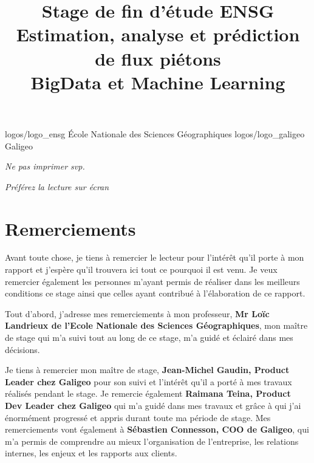 \documentclass{themeensg}
\title{Stage de fin d'étude ENSG \\ Estimation, analyse et prédiction de flux piétons \\ BigData et Machine Learning}
\renewcommand{\author}{Jules Pierrat}
\begin{document}
\begin{titlepage}
\enterprise 
{logos/logo_ensg}
{\'Ecole Nationale des Sciences Géographiques}
{logos/logo_galigeo}
{Galigeo}





\infos{\author}{Septembre 2022}

\begin{center}
  \textit{Ne pas imprimer svp.}
  
  \textit{Préférez la lecture sur écran}
\end{center}

\end{titlepage}



\newevenpage
\chapter*{Remerciements}

Avant toute chose, je tiens à remercier le lecteur pour l’intérêt qu’il porte à mon rapport et j’espère qu’il trouvera ici tout ce pourquoi il est venu. Je veux remercier également les personnes m’ayant permis de réaliser dans les meilleurs conditions ce stage ainsi que celles ayant contribué à l’élaboration de ce rapport.

Tout d'abord, j'adresse mes remerciements à mon professeur, \textbf{Mr Loïc Landrieux de l’Ecole Nationale des Sciences Géographiques}, mon maître de stage qui m’a suivi tout au long de ce stage, m’a guidé et éclairé dans mes décisions.

Je tiens à remercier mon maître de stage, \textbf{Jean-Michel Gaudin, Product Leader chez Galigeo} pour son suivi et l’intérêt qu’il a porté à mes travaux réalisés pendant le stage. Je remercie également \textbf{Raimana Teina, Product Dev Leader chez Galigeo} qui m’a guidé dans mes travaux et grâce à qui j’ai énormément progressé et appris durant toute ma période de stage. Mes remerciements vont également à \textbf{Sébastien Connesson, COO de Galigeo}, qui m’a permis de comprendre au mieux l’organisation de l’entreprise, les relations internes, les enjeux et les rapports aux clients.
\end{document}
